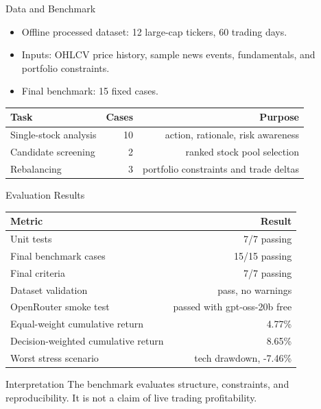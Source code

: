 \documentclass[aspectratio=169]{beamer}
\begin{document}
\begin{frame}{Data and Benchmark}
  \begin{itemize}
    \item Offline processed dataset: 12 large-cap tickers, 60 trading days.
    \item Inputs: OHLCV price history, sample news events, fundamentals, and portfolio constraints.
    \item Final benchmark: 15 fixed cases.
  \end{itemize}
  \vspace{0.4em}
  \begin{center}
  \begin{tabular}{lrr}
    \toprule
    Task & Cases & Purpose \\
    \midrule
    Single-stock analysis & 10 & action, rationale, risk awareness \\
    Candidate screening & 2 & ranked stock pool selection \\
    Rebalancing & 3 & portfolio constraints and trade deltas \\
    \bottomrule
  \end{tabular}
  \end{center}
\end{frame}

\begin{frame}{Evaluation Results}
  \begin{center}
  \begin{tabular}{lr}
    \toprule
    Metric & Result \\
    \midrule
    Unit tests & 7/7 passing \\
    Final benchmark cases & 15/15 passing \\
    Final criteria & 7/7 passing \\
    Dataset validation & pass, no warnings \\
    OpenRouter smoke test & passed with gpt-oss-20b free \\
    Equal-weight cumulative return & 4.77\% \\
    Decision-weighted cumulative return & 8.65\% \\
    Worst stress scenario & tech drawdown, -7.46\% \\
    \bottomrule
  \end{tabular}
  \end{center}
  \vspace{0.5em}
  \begin{block}{Interpretation}
    The benchmark evaluates structure, constraints, and reproducibility. It is not a claim of live trading profitability.
  \end{block}
\end{frame}
\end{document}
